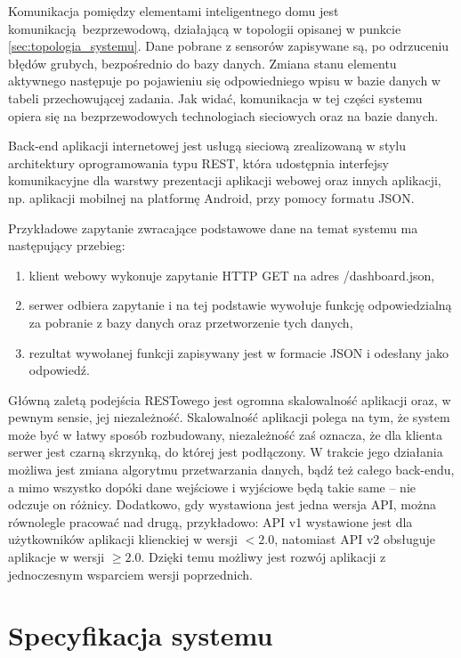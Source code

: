 \documentclass[eng,oneside]{mgr}
\begin{document}
Komunikacja pomiędzy elementami inteligentnego domu jest komunikacją bezprzewodową, działającą w topologii opisanej w punkcie \ref{sec:topologia_systemu}. Dane pobrane z sensorów zapisywane są, po odrzuceniu błędów grubych, bezpośrednio do bazy danych. Zmiana stanu elementu aktywnego następuje po pojawieniu się odpowiedniego wpisu w bazie danych w tabeli przechowującej zadania. Jak widać, komunikacja w tej części systemu opiera się na bezprzewodowych technologiach sieciowych oraz na bazie danych.

Back-end aplikacji internetowej jest usługą sieciową zrealizowaną w stylu architektury oprogramowania typu REST, która udostępnia interfejsy komunikacyjne dla warstwy prezentacji aplikacji webowej oraz innych aplikacji, np. aplikacji mobilnej na platformę Android, przy pomocy formatu JSON.

Przykładowe zapytanie zwracające podstawowe dane na temat systemu ma następujący przebieg:
\begin{enumerate}
	\item klient webowy wykonuje zapytanie HTTP GET na adres /dashboard.json,
	\item serwer odbiera zapytanie i na tej podstawie wywołuje funkcję odpowiedzialną za pobranie z bazy danych oraz przetworzenie tych danych, 
	\item rezultat wywołanej funkcji zapisywany jest w formacie JSON i odesłany jako odpowiedź.
\end{enumerate}

Główną zaletą podejścia RESTowego jest ogromna skalowalność aplikacji oraz, w pewnym sensie, jej niezależność. Skalowalność aplikacji polega na tym, że system może być w łatwy sposób rozbudowany, niezależność zaś oznacza, że dla klienta serwer jest czarną skrzynką, do której jest podłączony. W trakcie jego działania możliwa jest zmiana algorytmu przetwarzania danych, bądź też całego back-endu, a mimo wszystko dopóki dane wejściowe i wyjściowe będą takie same – nie odczuje on różnicy. Dodatkowo, gdy wystawiona jest jedna wersja API, można równolegle pracować nad drugą, przykładowo: API v1 wystawione jest dla użytkowników aplikacji klienckiej w wersji $<2.0$, natomiast API v2 obsługuje aplikacje w wersji $\ge2.0$. Dzięki temu możliwy jest rozwój aplikacji z jednoczesnym wsparciem wersji poprzednich. 

\chapter{Specyfikacja systemu}
\end{document}
